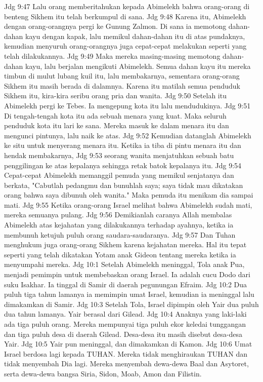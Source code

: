 Jdg 9:47  Lalu orang memberitahukan kepada Abimelekh bahwa orang-orang di benteng Sikhem itu telah berkumpul di sana.
Jdg 9:48  Karena itu, Abimelekh dengan orang-orangnya pergi ke Gunung Zalmon. Di sana ia memotong dahan-dahan kayu dengan kapak, lalu memikul dahan-dahan itu di atas pundaknya, kemudian menyuruh orang-orangnya juga cepat-cepat melakukan seperti yang telah dilakukannya.
Jdg 9:49  Maka mereka masing-masing memotong dahan-dahan kayu, lalu berjalan mengikuti Abimelekh. Semua dahan kayu itu mereka timbun di mulut lubang kuil itu, lalu membakarnya, sementara orang-orang Sikhem itu masih berada di dalamnya. Karena itu matilah semua penduduk Sikhem itu, kira-kira seribu orang pria dan wanita.
Jdg 9:50  Setelah itu Abimelekh pergi ke Tebes. Ia mengepung kota itu lalu mendudukinya.
Jdg 9:51  Di tengah-tengah kota itu ada sebuah menara yang kuat. Maka seluruh penduduk kota itu lari ke sana. Mereka masuk ke dalam menara itu dan mengunci pintunya, lalu naik ke atas.
Jdg 9:52  Kemudian datanglah Abimelekh ke situ untuk menyerang menara itu. Ketika ia tiba di pintu menara itu dan hendak membakarnya,
Jdg 9:53  seorang wanita menjatuhkan sebuah batu penggilingan ke atas kepalanya sehingga retak batok kepalanya itu.
Jdg 9:54  Cepat-cepat Abimelekh memanggil pemuda yang memikul senjatanya dan berkata, "Cabutlah pedangmu dan bunuhlah saya; saya tidak mau dikatakan orang bahwa saya dibunuh oleh wanita." Maka pemuda itu menikam dia sampai mati.
Jdg 9:55  Ketika orang-orang Israel melihat bahwa Abimelekh sudah mati, mereka semuanya pulang.
Jdg 9:56  Demikianlah caranya Allah membalas Abimelekh atas kejahatan yang dilakukannya terhadap ayahnya, ketika ia membunuh ketujuh puluh orang saudara-saudaranya.
Jdg 9:57  Dan Tuhan menghukum juga orang-orang Sikhem karena kejahatan mereka. Hal itu tepat seperti yang telah dikatakan Yotam anak Gideon tentang mereka ketika ia menyumpahi mereka.
Jdg 10:1  Setelah Abimelekh meninggal, Tola anak Pua, menjadi pemimpin untuk membebaskan orang Israel. Ia adalah cucu Dodo dari suku Isakhar. Ia tinggal di Samir di daerah pegunungan Efraim.
Jdg 10:2  Dua puluh tiga tahun lamanya ia memimpin umat Israel, kemudian ia meninggal lalu dimakamkan di Samir.
Jdg 10:3  Setelah Tola, Israel dipimpin oleh Yair dua puluh dua tahun lamanya. Yair berasal dari Gilead.
Jdg 10:4  Anaknya yang laki-laki ada tiga puluh orang. Mereka mempunyai tiga puluh ekor keledai tunggangan dan tiga puluh desa di daerah Gilead. Desa-desa itu masih disebut desa-desa Yair.
Jdg 10:5  Yair pun meninggal, dan dimakamkan di Kamon.
Jdg 10:6  Umat Israel berdosa lagi kepada TUHAN. Mereka tidak menghiraukan TUHAN dan tidak menyembah Dia lagi. Mereka menyembah dewa-dewa Baal dan Asytoret, serta dewa-dewa bangsa Siria, Sidon, Moab, Amon dan Filistin.
